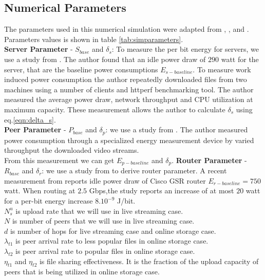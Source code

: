 \documentclass[conference]{IEEEtran}
\begin{document}
\subsection{Numerical Parameters}
The parameters used in this numerical simulation were adapted from \cite{Nedevschi:2008:HDC:1855610.1855618}, \cite{valancius2009greening}, \cite{4509688} and \cite{Sun:2009:POS:1542245.1542249}. 
Parameters values is shown in table \ref{tab:simparameters}.\\
\textbf{Server Parameter} - $S_{base}$ and $\delta_s$: To measure the per bit energy for servers, we use a study from \cite{Nedevschi:2008:HDC:1855610.1855618}. 
The author found that an idle power draw of $290$ watt for the server, that are the baseline power consumptions $E_{s-baseline}$.
To measure work induced power consumption the author repeatedly downloaded files from two machines using a number of clients and httperf benchmarking tool.
The author measured the average power draw, network throughput and CPU utilization at maximum capacity. 
These measurement allows the author to calculate $\delta_s$ using eq.\ref{eqn:delta_s}.\\
\textbf{Peer Parameter} - $P_{base}$ and $\delta_p$: we use a study from \cite{valancius2009greening}.
The author measured power consumption through a specialized energy measurement device by varied throughput the downloaded video streams. \\
From this measurement we can get $E_{p-baseline}$ and $\delta_p$.
\textbf{Router Parameter} - $R_{base}$ and $\delta_r$: we use a study from \cite{4509688} to derive router parameter.
A recent measurement from \cite{4509688} reports idle power draw of Cisco GSR router $E_{r-baseline}=750$ watt. 
When routing at $2.5$ Gbps,the study reports an increase of at most $20$ watt for a per-bit energy increase $8.10^{-9}$ J/bit.\\
$N_{s}^{u}$ is upload rate that we will use in live streaming case.\\
$N$ is number of peers that we will use in live streaming case. \\
$d$ is number of hops for live streaming case and online storage case.\\
$\lambda_{t1}$ is peer arrival rate to less popular files in online storage case.\\
$\lambda_{t2}$ is peer arrival rate to popular files in online storage case.\\
$\eta_{t1}$ and $\eta_{t2}$ is file sharing effectiveness. It is the fraction of the upload capacity of peers that is being utilized in online storage case.\\
\end{document}
